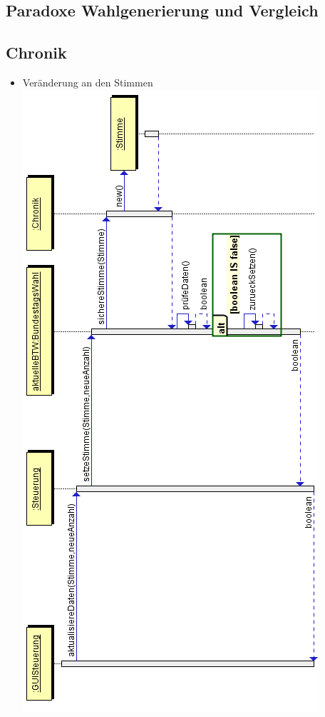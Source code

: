 \documentclass[12pt,a4paper,titlepage]{article}
\begin{document}
\newpage
\subsection{Paradoxe Wahlgenerierung und Vergleich}

\newpage
\subsection{Chronik}
\begin{itemize}
	\item Veränderung an den Stimmen \\
		\includegraphics[scale=0.7]{Sequenzdiagramme/Chronik_Sequenzdiagramm-stimmenaendern.png}

\end{itemize}
\end{document}

